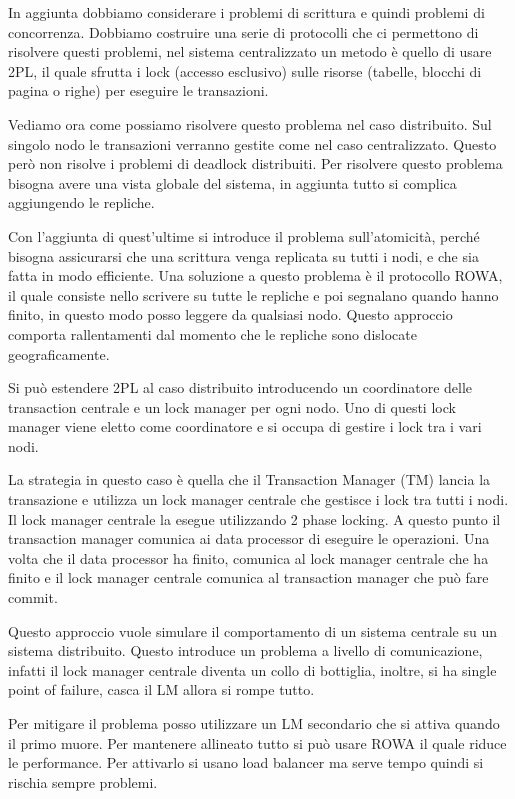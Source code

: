 In aggiunta dobbiamo considerare i problemi di scrittura e quindi problemi di
concorrenza. Dobbiamo costruire una serie di protocolli che ci permettono di
risolvere questi problemi, nel sistema centralizzato un metodo è quello di usare
2PL, il quale sfrutta i lock (accesso esclusivo) sulle risorse (tabelle, blocchi
di pagina o righe) per eseguire le transazioni.

Vediamo ora come possiamo risolvere questo problema nel caso distribuito. Sul
singolo nodo le transazioni verranno gestite come nel caso centralizzato. Questo
però non risolve i problemi di deadlock distribuiti. Per risolvere questo problema
bisogna avere una vista globale del sistema, in aggiunta tutto si complica
aggiungendo le repliche.

Con l'aggiunta di quest'ultime si introduce il problema sull'atomicità, perché
bisogna assicurarsi che una scrittura venga replicata su tutti i nodi, e che sia
fatta in modo efficiente. Una soluzione a questo problema è il protocollo ROWA,
il quale consiste nello scrivere su tutte le repliche e poi segnalano quando
hanno finito, in questo modo posso leggere da qualsiasi nodo. Questo approccio
comporta rallentamenti dal momento che le repliche sono dislocate geograficamente.

Si può estendere 2PL al caso distribuito introducendo un coordinatore delle
transaction centrale e un lock manager per ogni nodo. Uno di questi lock manager
viene eletto come coordinatore e si occupa di gestire i lock tra i vari nodi.

La strategia in questo caso è quella che il Transaction Manager (TM) lancia la
transazione e utilizza un lock manager centrale che gestisce i lock tra tutti i
nodi. Il lock manager centrale la esegue utilizzando 2 phase locking. A questo
punto il transaction manager comunica ai data processor di eseguire le operazioni.
Una volta che il data processor ha finito, comunica al lock manager centrale che
ha finito e il lock manager centrale comunica al transaction manager che può fare
commit.

Questo approccio vuole simulare il comportamento di un sistema centrale su un
sistema distribuito. Questo introduce un problema a livello di comunicazione,
infatti il lock manager centrale diventa un collo di bottiglia, inoltre, si ha
single point of failure, casca il LM allora si rompe tutto.

Per mitigare il problema posso utilizzare un LM secondario che si attiva quando
il primo muore. Per mantenere allineato tutto si può usare ROWA il quale riduce
le performance. Per attivarlo si usano load balancer ma serve tempo quindi si
rischia sempre problemi.

